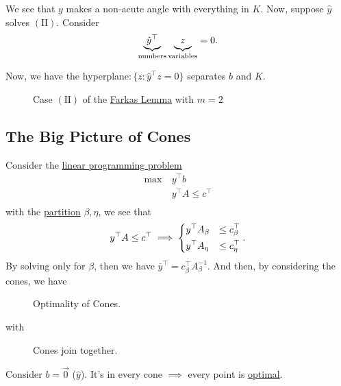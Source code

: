 We see that \(y\) makes a non-acute angle with everything in \(K\). Now, suppose \(\hat{y}\) solves \((\mathrm{II})\). Consider
\[
	\underbrace{\hat{y}^{\top}}_{\text{numbers}} \underbrace{\vphantom{y}z}_{\text{variables}} = 0.
\]

Now, we have the hyperplane\(\colon\)\(\{z\colon \hat{y} ^{\top} z = 0\}\) separates \(b\) and \(K\).

\begin{figure}[H]
	\centering
	\caption{Case \((\mathrm{II})\) of the \hyperref[lma:Farkas]{Farkas Lemma} with \(m = 2\)}
	\label{fig:Farkas-lemma-extended}
\end{figure}

\subsection{The Big Picture of Cones}
Consider the \hyperref[def:general-linear-programming-problem]{linear programming problem}
\[
	\begin{aligned}
		\max~ & y^{\top} b               \\
		      & y^{\top} A \leq c^{\top} \\
	\end{aligned}
\]
with the \hyperref[def:partition]{partition} \(\beta, \eta\), we see that
\[
	y^{\top} A \leq c^{\top} \implies \begin{dcases}
		y^{\top} A_{\beta} & \leq c^{\top}_{\beta} \\
		y^{\top} A_{\eta}  & \leq c^{\top}_{\eta}
	\end{dcases}.
\]
By solving only for \(\beta\), then we have \(\overline{y}^{\top} = c_{\beta}^{\top} A^{-1}_{\beta}\). And then, by considering the cones, we have

\begin{figure}[H]
	\centering
	\caption[Caption for LOF]{Optimality of Cones.\protect\footnotemark}
	\label{fig:opt-cones}
\end{figure}
with
\begin{figure}[H]
	\centering
	\caption{Cones join together.}
	\label{fig:cones-join}
\end{figure}

\begin{note}
	Consider \(b = \vec{0}\) (\(\hat{y}\)). It's in every cone \(\implies\) every point is \hyperref[def:optimal-solution]{optimal}.
\end{note}

